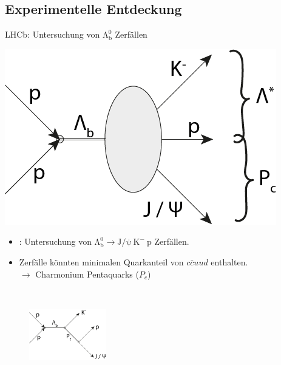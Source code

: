 \documentclass[aspectratio=169]{beamer} %
\begin{document}
      \subsection{Experimentelle Entdeckung}
    \begin{frame}{LHCb: Untersuchung von $\mathrm{\Lambda_b^0}$ Zerfällen} %
        \begin{minipage}{0.31\textwidth}
          \includegraphics[width=\linewidth]{FeynmanDiag/Gesamt.png} 
        \end{minipage}
        \hfill
        \begin{minipage}{0.67\textwidth}
          \begin{itemize}
            \item \textcite{Aaij.2015}: Untersuchung von $\mathrm{\Lambda_b^0} \to \mathrm{J}/\mathrm{\psi}\:\mathrm{K}^-\:\mathrm{p}$ Zerfällen.
            \item Zerfälle könnten minimalen Quarkanteil von $c\bar{c}uud$ enthalten. \\ $\rightarrow$ Charmonium Pentaquarks ($P_c$)
          \end{itemize}
        \end{minipage}
          \\
          \begin{figure}
          \centering
          \includegraphics[width=0.3\textwidth]{FeynmanDiag/pentaquark.png}

\end{figure}
\end{frame}
\end{document}
